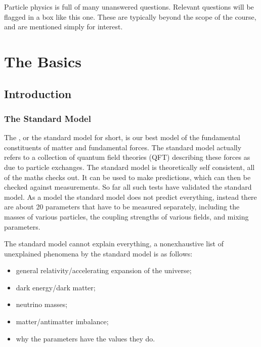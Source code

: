 \documentclass[fleqn]{NotesClass}
\begin{document}
    \begin{openquestion}{}{}
        Particle physics is full of many unanswered questions.
        Relevant questions will be flagged in a box like this one.
        These are typically beyond the scope of the course, and are mentioned simply for interest.
    \end{openquestion}
    
    \part{The Basics}    
    \chapter{Introduction}
    \section{The Standard Model}
    The , or the standard model for short, is our best model of the fundamental constituents of matter and fundamental forces.
    The standard model actually refers to a collection of quantum field theories (QFT) describing these forces as due to particle exchanges.
    The standard model is theoretically self consistent, all of the maths checks out.
    It can be used to make predictions, which can then be checked against measurements.
    So far all such tests have validated the standard model.
    As a model the standard model does not predict everything, instead there are about 20 parameters that have to be measured separately, including the masses of various particles, the coupling strengths of various fields, and mixing parameters.
    
    The standard model cannot explain everything, a nonexhaustive list of unexplained phenomena by the standard model is as follows:
    \begin{itemize}
        \item general relativity/accelerating expansion of the universe;
        \item dark energy/dark matter;
        \item neutrino masses;
        \item matter/antimatter imbalance;
        \item why the parameters have the values they do.
    \end{itemize}
    
\end{document}
